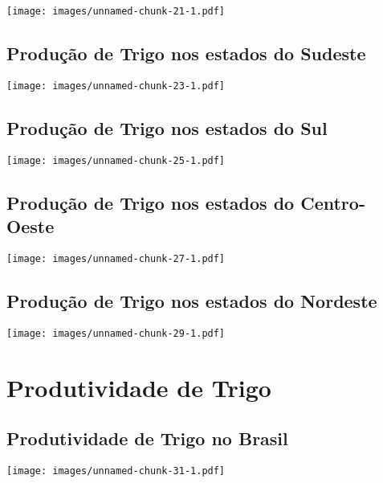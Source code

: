 \documentclass[
]{article}
\begin{document}
\texttt{[image: images/unnamed-chunk-21-1.pdf]}

\hypertarget{produuxe7uxe3o-de-trigo-nos-estados-do-sudeste}{%
\subsection{Produção de Trigo nos estados do
Sudeste}\label{produuxe7uxe3o-de-trigo-nos-estados-do-sudeste}}

\texttt{[image: images/unnamed-chunk-23-1.pdf]}

\hypertarget{produuxe7uxe3o-de-trigo-nos-estados-do-sul}{%
\subsection{Produção de Trigo nos estados do
Sul}\label{produuxe7uxe3o-de-trigo-nos-estados-do-sul}}

\texttt{[image: images/unnamed-chunk-25-1.pdf]}

\hypertarget{produuxe7uxe3o-de-trigo-nos-estados-do-centro-oeste}{%
\subsection{Produção de Trigo nos estados do
Centro-Oeste}\label{produuxe7uxe3o-de-trigo-nos-estados-do-centro-oeste}}

\texttt{[image: images/unnamed-chunk-27-1.pdf]}

\hypertarget{produuxe7uxe3o-de-trigo-nos-estados-do-nordeste}{%
\subsection{Produção de Trigo nos estados do
Nordeste}\label{produuxe7uxe3o-de-trigo-nos-estados-do-nordeste}}

\texttt{[image: images/unnamed-chunk-29-1.pdf]}

\hypertarget{produtividade-de-trigo}{%
\section{Produtividade de Trigo}\label{produtividade-de-trigo}}

\hypertarget{produtividade-de-trigo-no-brasil}{%
\subsection{Produtividade de Trigo no
Brasil}\label{produtividade-de-trigo-no-brasil}}

\texttt{[image: images/unnamed-chunk-31-1.pdf]}
\end{document}
